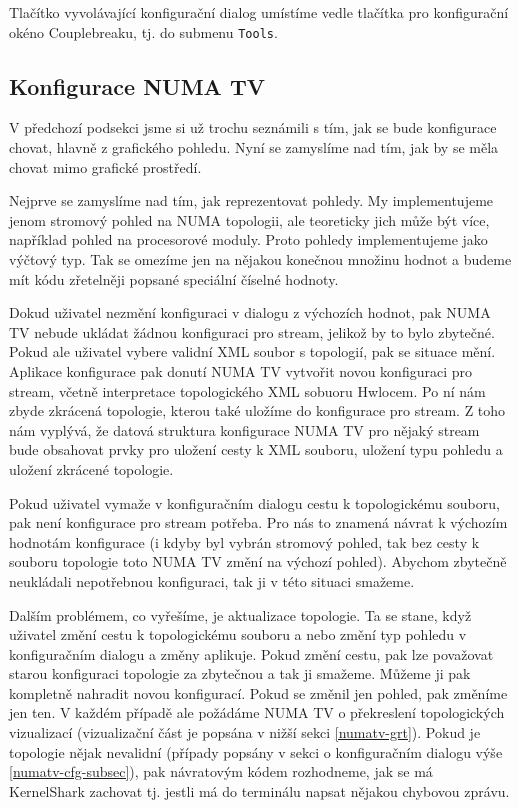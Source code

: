 Tlačítko vyvolávající konfigurační dialog umístíme vedle tlačítka pro konfigurační okéno Couplebreaku, tj. do submenu \texttt{Tools}.

\subsection{Konfigurace NUMA TV}

V předchozí podsekci jsme si už trochu seznámili s tím, jak se bude konfigurace chovat, hlavně z grafického pohledu. Nyní se zamyslíme nad tím, jak by se měla chovat mimo grafické prostředí.

Nejprve se zamyslíme nad tím, jak reprezentovat pohledy. My implementujeme jenom stromový pohled na NUMA topologii, ale teoreticky jich může být více, například pohled na procesorové moduly. Proto pohledy implementujeme jako výčtový typ. Tak se omezíme jen na nějakou konečnou množinu hodnot a budeme mít kódu zřetelněji popsané speciální číselné hodnoty.

Dokud uživatel nezmění konfiguraci v dialogu z výchozích hodnot, pak NUMA TV nebude ukládat žádnou konfiguraci pro stream, jelikož by to bylo zbytečné. Pokud ale uživatel vybere validní XML soubor s topologií, pak se situace mění. Aplikace konfigurace pak donutí NUMA TV vytvořit novou konfiguraci pro stream, včetně interpretace topologického XML sobuoru Hwlocem. Po ní nám zbyde zkrácená topologie, kterou také uložíme do konfigurace pro stream. Z toho nám vyplývá, že datová struktura konfigurace NUMA TV pro nějaký stream bude obsahovat prvky pro uložení cesty k XML souboru, uložení typu pohledu a uložení zkrácené topologie.

Pokud uživatel vymaže v konfiguračním dialogu cestu k topologickému souboru, pak není konfigurace pro stream potřeba. Pro nás to znamená návrat k výchozím hodnotám konfigurace (i kdyby byl vybrán stromový pohled, tak bez cesty k souboru topologie toto NUMA TV změní na výchozí pohled). Abychom zbytečně neukládali nepotřebnou konfiguraci, tak ji v této situaci smažeme.

Dalším problémem, co vyřešíme, je aktualizace topologie. Ta se stane, když uživatel změní cestu k topologickému souboru a nebo změní typ pohledu v konfiguračním dialogu a změny aplikuje. Pokud změní cestu, pak lze považovat starou konfiguraci topologie za zbytečnou a tak ji smažeme. Můžeme ji pak kompletně nahradit novou konfigurací. Pokud se změnil jen pohled, pak změníme jen ten. V každém případě ale požádáme  NUMA TV o překreslení topologických vizualizací (vizualizační část je popsána v nižší sekci \ref{numatv-grt}). Pokud je topologie nějak nevalidní (případy popsány v sekci o konfiguračním dialogu výše \ref{numatv-cfg-subsec}), pak návratovým kódem rozhodneme, jak se má KernelShark zachovat tj. jestli má do terminálu napsat nějakou chybovou zprávu.

